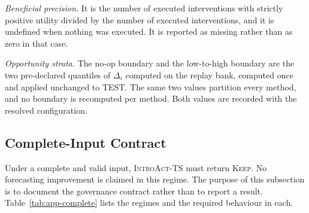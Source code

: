 \documentclass{article}
\newcommand{\introact}{\textsc{IntroAct-TS}}
\begin{document}
\emph{Beneficial precision.} It is the number of executed interventions with strictly positive
utility divided by the number of executed interventions, and it is undefined when nothing was
executed. It is reported as missing rather than as zero in that case.

\emph{Opportunity strata.} The no-op boundary and the low-to-high boundary are the two
pre-declared quantiles of $\Delta_i$ computed on the replay bank, computed once and applied
unchanged to TEST. The same two values partition every method, and no boundary is recomputed
per method. Both values are recorded with the resolved configuration.

\subsection{Complete-Input Contract}
\label{app:contract}
Under a complete and valid input, \introact{} must return \textsc{Keep}. No forecasting
improvement is claimed in this regime. The purpose of this subsection is to document the
governance contract rather than to report a result. Table~\ref{tab:app-complete} lists the
regimes and the required behaviour in each.

\begin{table}[h]
  \caption{Governance contract by input regime. The complete-input rows are contract
  statements and not accuracy results. The expected behaviour there is a no-op, and a non-no-op
  would be a defect rather than an improvement.}
  \label{tab:app-complete}
  \centering
  \small
  \setlength{\tabcolsep}{4pt}
\end{table}
\end{document}
